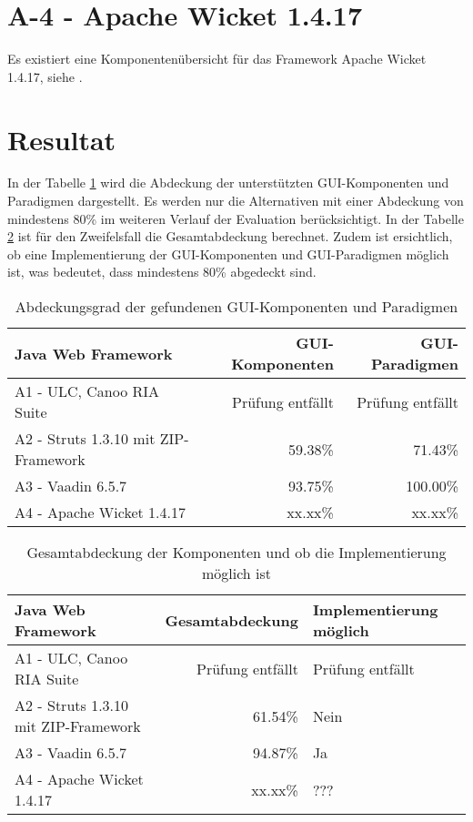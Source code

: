 \section{A-4 - Apache Wicket 1.4.17}

Es existiert eine Komponentenübersicht für das Framework Apache Wicket 1.4.17,
siehe \cite{WicketComponents}.

\section{Resultat}

In der Tabelle \ref{tab:unterstuetztungDerKomponenten} wird die Abdeckung der
unterstützten GUI-Komponenten und Paradigmen dargestellt. Es werden nur die
Alternativen mit einer Abdeckung von mindestens 80\% im weiteren
Verlauf der Evaluation berücksichtigt. In der Tabelle
\ref{tab:gesamtabdeckungUndObImplementierungMoeglichIst} ist für den
Zweifelsfall die Gesamtabdeckung berechnet. Zudem ist ersichtlich, ob eine
Implementierung der GUI-Komponenten und GUI-Paradigmen möglich ist, was
bedeutet, dass mindestens 80\% abgedeckt sind.

\begin{table}[!h]
  \sffamily 
  \begin{center}
    \begin{tabular}{lrr}
      \toprule
      \textbf{Java Web Framework} & \textbf{GUI-Komponenten} &
      \textbf{GUI-Paradigmen} \\
      \midrule
      A1 - ULC, Canoo RIA Suite & Prüfung entfällt & Prüfung entfällt\\
      A2 - Struts 1.3.10 mit ZIP-Framework & 59.38\% & 71.43\%\\
      A3 - Vaadin 6.5.7 & 93.75\% & 100.00\%\\
      A4 - Apache Wicket 1.4.17 & xx.xx\% & xx.xx\%\\
      \bottomrule
    \end{tabular}
    \caption{Abdeckungsgrad der gefundenen GUI-Komponenten und Paradigmen}
    \label{tab:unterstuetztungDerKomponenten}
  \end{center}
\end{table}

\begin{table}[!h]
  \sffamily 
  \begin{center}
    \begin{tabular}{lrp{3cm}}
      \toprule
      \textbf{Java Web Framework} & \textbf{Gesamtabdeckung} &
      \textbf{Implementierung möglich}\\
      \midrule
      A1 - ULC, Canoo RIA Suite & Prüfung entfällt & Prüfung entfällt\\
      A2 - Struts 1.3.10 mit ZIP-Framework & 61.54\% & Nein\\
      A3 - Vaadin 6.5.7 & 94.87\% & Ja\\
      A4 - Apache Wicket 1.4.17 & xx.xx\% & ???\\
      \bottomrule
    \end{tabular}
    \caption{Gesamtabdeckung der Komponenten und ob die Implementierung möglich
    ist}
    \label{tab:gesamtabdeckungUndObImplementierungMoeglichIst}
  \end{center}
\end{table}